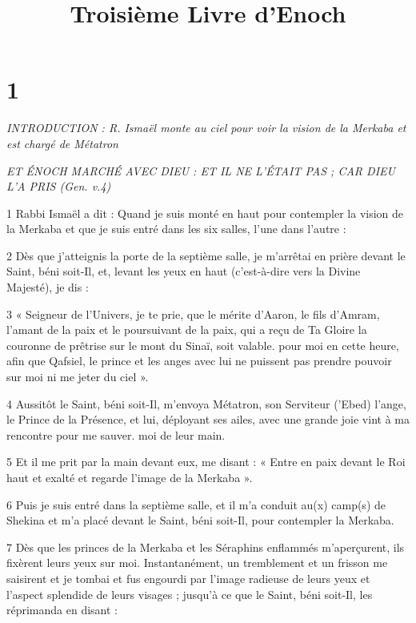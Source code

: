 

\title{Troisième Livre d'Enoch}

\chapter{1}

\par \textit{INTRODUCTION : R. Ismaël monte au ciel pour voir la vision de la Merkaba et est chargé de Métatron}

\par \textit{ET ÉNOCH MARCHÉ AVEC DIEU : ET IL NE L'ÉTAIT PAS ; CAR DIEU L'A PRIS (Gen. v.4)}

\par 1 Rabbi Ismaël a dit : Quand je suis monté en haut pour contempler la vision de la Merkaba et que je suis entré dans les six salles, l'une dans l'autre :

\par 2 Dès que j'atteignis la porte de la septième salle, je m'arrêtai en prière devant le Saint, béni soit-Il, et, levant les yeux en haut (c'est-à-dire vers la Divine Majesté), je dis :

\par 3 « Seigneur de l'Univers, je te prie, que le mérite d'Aaron, le fils d'Amram, l'amant de la paix et le poursuivant de la paix, qui a reçu de Ta Gloire la couronne de prêtrise sur le mont du Sinaï, soit valable. pour moi en cette heure, afin que Qafsiel, le prince et les anges avec lui ne puissent pas prendre pouvoir sur moi ni me jeter du ciel ».

\par 4 Aussitôt le Saint, béni soit-Il, m'envoya Métatron, son Serviteur ('Ebed) l'ange, le Prince de la Présence, et lui, déployant ses ailes, avec une grande joie vint à ma rencontre pour me sauver. moi de leur main.

\par 5 Et il me prit par la main devant eux, me disant : « Entre en paix devant le Roi haut et exalté et regarde l'image de la Merkaba ».

\par 6 Puis je suis entré dans la septième salle, et il m'a conduit au(x) camp(s) de Shekina et m'a placé devant le Saint, béni soit-Il, pour contempler la Merkaba.

\par 7 Dès que les princes de la Merkaba et les Séraphins enflammés m'aperçurent, ils fixèrent leurs yeux sur moi. Instantanément, un tremblement et un frisson me saisirent et je tombai et fus engourdi par l'image radieuse de leurs yeux et l'aspect splendide de leurs visages ; jusqu'à ce que le Saint, béni soit-Il, les réprimanda en disant :

